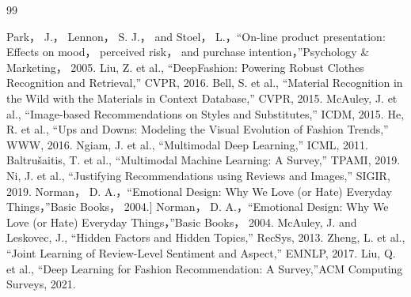 \documentclass[a4paper,12pt]{jreport}
\begin{document}
\begin{thebibliography}{99}


%
Park， J.， Lennon， S. J.， and Stoel， L.，“On-line product presentation: Effects on mood， perceived risk， and purchase intention，”Psychology \& Marketing， 2005.
%
Liu, Z. et al., “DeepFashion: Powering Robust Clothes Recognition and Retrieval,” CVPR, 2016.
%
Bell, S. et al., “Material Recognition in the Wild with the Materials in Context Database,” CVPR, 2015.
%
 McAuley, J. et al., “Image-based Recommendations on Styles and Substitutes,” ICDM, 2015.
%
He, R. et al., “Ups and Downs: Modeling the Visual Evolution of Fashion Trends,” WWW, 2016.
%
Ngiam, J. et al., “Multimodal Deep Learning,” ICML, 2011.
%
Baltrušaitis, T. et al., “Multimodal Machine Learning: A Survey,” TPAMI, 2019.
%
Ni, J. et al., “Justifying Recommendations using Reviews and Images,” SIGIR, 2019.
%
 Norman， D. A.，“Emotional Design: Why We Love (or Hate) Everyday Things，”Basic Books， 2004.] Norman， D. A.，“Emotional Design: Why We Love (or Hate) Everyday Things，”Basic Books， 2004.
%
McAuley, J. and Leskovec, J., “Hidden Factors and Hidden Topics,” RecSys, 2013.
%
Zheng, L. et al., “Joint Learning of Review-Level Sentiment and Aspect,” EMNLP, 2017.
%
Liu, Q. et al., “Deep Learning for Fashion Recommendation: A Survey,”ACM Computing Surveys, 2021.


\end{thebibliography}
\end{document}
